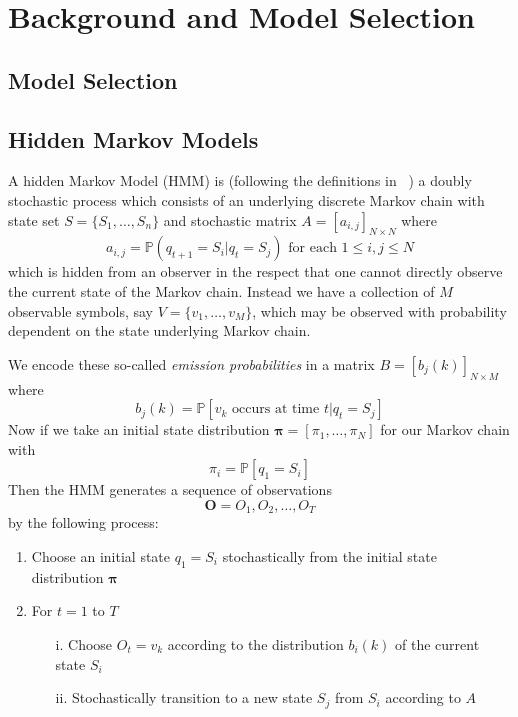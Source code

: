 
\chapter{Background and Model Selection}
\ifpdf
    \graphicspath{{Chapter1/Chapter1Figs/PNG/}{Chapter1/Chapter1Figs/PDF/}{Chapter1/Chapter1Figs/}}
\else
    \graphicspath{{Chapter1/Chapter1Figs/EPS/}{Chapter1/Chapter1Figs/}}
\fi

\section{Model Selection}

\section{Hidden Markov Models}
A hidden Markov Model (HMM) is (following the definitions in ~\cite{rabiner1989tutorial}) a doubly stochastic process which consists of an underlying discrete Markov chain with state set $S = \{S_1, \dots, S_n \}$ and stochastic matrix $A=[a_{i,j}]_{N\times N}$ where 
\begin{equation*}
a_{i,j} = \mathbb{P}(q_{t+1} = S_i | q_t = S_j) \text{  for each  } 1 \leq i,j \leq N
\end{equation*}
which is hidden from an observer in the respect that one cannot directly observe the current state of the Markov chain. Instead we have a collection of $M$ observable symbols, say $V = \{ v_1, \dots, v_M\}$, which may be observed with probability dependent on the state underlying Markov chain. 

We encode these so-called \emph{emission probabilities} in a matrix $B = [b_j(k)]_{N\times M}$ where
\begin{equation*}
b_j(k) = \mathbb{P}[v_k \text{ occurs at time }t | q_t = S_j] 
\end{equation*}
Now if we take an initial state distribution $\bm{\pi} = [\pi_1, \dots, \pi_N]$ for our Markov chain with
\begin{equation*}
\pi_i= \mathbb{P}[q_1 = S_i]
\end{equation*}
Then the HMM generates a sequence of observations
\begin{equation*}
\bm{O} = O_1, O_2, \ldots , O_T
\end{equation*}
by the following process:
\begin{enumerate}
\item Choose an initial state $q_1 = S_i$ stochastically from the initial state distribution $\bm{\pi}$
\item For $t=1$ to $T$
\begin{enumerate}
\item[i.] Choose $O_t = v_k$ according to the distribution $b_i(k)$ of the current state $S_i$
\item[ii.] Stochastically transition to a new state $S_j$ from $S_i$ according to $A$ 
\end{enumerate}
\end{enumerate}

